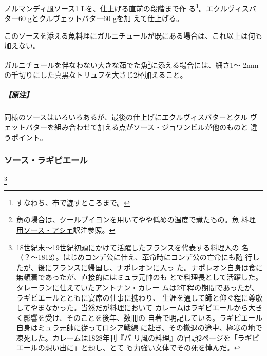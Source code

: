 \begin{recette}

\protect\hyperlink{sauce-normande}{ノルマンディ風ソース}1
Lを、仕上げる直前の段階まで作 る\footnote{すなわち、布で漉すところまで。}。\protect\hyperlink{}{エクルヴィスバター}60
gと\protect\hyperlink{}{クルヴェットバター}60 gを加 えて仕上げる。

このソースを添える魚料理にガルニチュールが既にある場合は、これ以上は何も加えない。

ガルニチュールを伴なわない大きな茹でた魚\footnote{魚の場合は、クールブイヨンを用いてやや低めの温度で煮たもの。\protect\hyperlink{sauce-hachee-maigre}{魚
  料理用ソース・アシェ}訳注参照。}に添える場合には、細さ1〜
2mmの千切りにした真黒なトリュフを大さじ2杯加えること。

\hypertarget{nota-sauce-joinville}{%
\subparagraph{【原注】}\label{nota-sauce-joinville}}

同様のソースはいろいろあるが、最後の仕上げにエクルヴィスバターとクル
ヴェットバターを組み合わせて加える点がソース・ジョワンビルが他のものと
違うポイント。

\hypertarget{sauce-laguipiere}{%
\subsubsection{ソース・ラギピエール}\label{sauce-laguipiere}}

\footnote{18世紀末〜19世紀初頭にかけて活躍したフランスを代表する料理人の
  名（？〜1812）。はじめコンデ公に仕え、革命時にコンデ公の亡命にも随
  行したが、後にフランスに帰国し、ナポレオンに入っ
  た。ナポレオン自身は食に無頓着であったが、直接的にはミュラ元帥のも
  とで料理長として活躍した。タレーランに仕えていたアントナン・カレー
  ムは2年程の期間であったが、ラギピエールとともに宴席の仕事に携わり、
  生涯を通して師と仰ぐ程に尊敬してやまなかった。当然だが料理において
  カレームはラギピエールから大きく影響を受け、そのことを後年、数冊の
  自著で明記している。ラギピエール自身はミュラ元帥に従ってロシア戦線
  に赴き、その撤退の途中、極寒の地で凍死した。カレームは1828年刊『パ
  リ風の料理』の冒頭2ページを「ラギピエールの想い出に」と題し、とて
  も力強い文体でその死を悼んだ。}


\end{recette}
